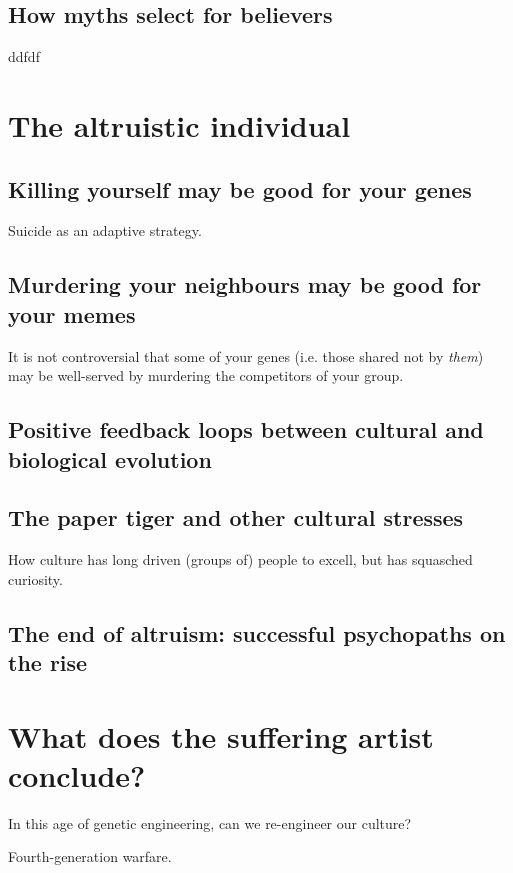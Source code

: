 \documentclass{article}
\begin{document}
\subsection{How myths select for believers}

ddfdf

\section{The altruistic individual}

\subsection{Killing yourself may be good for your genes}

Suicide as an adaptive strategy.

\subsection{Murdering your neighbours may be good for your memes}

It is not controversial that some of your genes (i.e. those shared not by \emph{them}) may be well-served by murdering the competitors of your group.

\subsection{Positive feedback loops between cultural and biological evolution}

\subsection{The paper tiger and other cultural stresses}

How culture has long driven (groups of) people to excell, but has squasched curiosity.

\subsection{The end of altruism: successful psychopaths on the rise}

\section{What does the suffering artist conclude?}

In this age of genetic engineering, can we re-engineer our culture?

Fourth-generation warfare.




\end{document}
